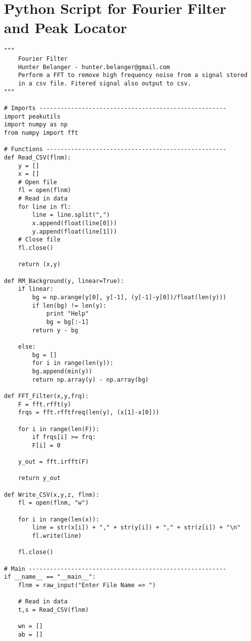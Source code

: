 \section{Python Script for Fourier Filter and Peak Locator}
\label{appendix:fft_filter}
\begin{singlespace}
\begin{verbatim}
"""
    Fourier Filter
    Hunter Belanger - hunter.belanger@gmail.com
    Perform a FFT to remove high frequency noise from a signal stored
    in a csv file. Fitered signal also output to csv.
"""

# Imports -----------------------------------------------------
import peakutils
import numpy as np
from numpy import fft

# Functions ---------------------------------------------------
def Read_CSV(flnm):
    y = []
    x = []
    # Open file
    fl = open(flnm)
    # Read in data
    for line in fl:
        line = line.split(",")
        x.append(float(line[0]))
        y.append(float(line[1]))
    # Close file
    fl.close()
    
    return (x,y)

def RM_Background(y, linear=True):
    if linear:
        bg = np.arange(y[0], y[-1], (y[-1]-y[0])/float(len(y)))
        if len(bg) != len(y):
            print "Help"
            bg = bg[:-1]
        return y - bg
    
    else:
        bg = []
        for i in range(len(y)):
        bg.append(min(y))
        return np.array(y) - np.array(bg)

def FFT_Filter(x,y,frq):
    F = fft.rfft(y)
    frqs = fft.rfftfreq(len(y), (x[1]-x[0]))
    
    for i in range(len(F)):
        if frqs[i] >= frq:
        F[i] = 0

    y_out = fft.irfft(F)
    
    return y_out

def Write_CSV(x,y,z, flnm):
    fl = open(flnm, "w")

    for i in range(len(x)):
        line = str(x[i]) + "," + str(y[i]) + "," + str(z[i]) + "\n"
        fl.write(line)
    
    fl.close()

# Main --------------------------------------------------------
if __name__ == "__main__":
    flnm = raw_input("Enter File Name => ")
    
    # Read in data
    t,s = Read_CSV(flnm)
    
    wn = []
    ab = []
    

\end{verbatim}
\end{singlespace}
